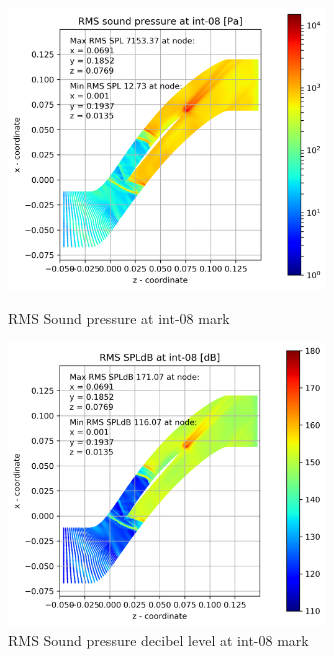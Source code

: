 \begin{figure}[ht]
  \centering
  \includegraphics[width=0.75\textwidth]{Figures/int-08-rms-spl.png}
  \caption{RMS Sound pressure at int-08 mark} \label{int-08-rms-spl}
  
  \vspace*{\floatsep}%

  \includegraphics[width=0.75\textwidth]{Figures/int-08-rms-spldb.png}
  \caption{RMS Sound pressure decibel level at int-08 mark} \label{int-08-rms-spldb}
\end{figure}

